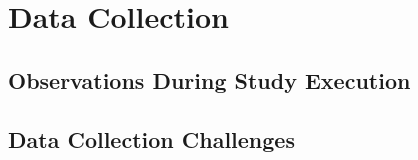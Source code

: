 \section{Data Collection} \label{sec:data_collection}

\subsection{Observations During Study Execution} \label{subsec:observations}

\subsection{Data Collection Challenges} \label{subsec:data_collection}
